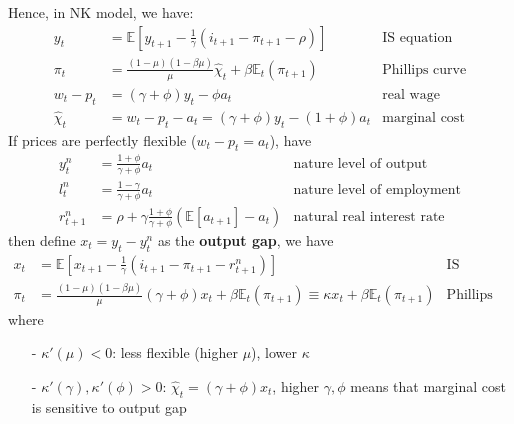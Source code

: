 \documentclass[10pt,landscape,a4paper]{article}
\begin{document}
\begin{multicols*}{3}
Hence, in NK model, we have:
\begin{align*}
    y_t &= \mathbb{E}\left[y_{t+1}-\frac{1}{\gamma} (i_{t+1}-\pi_{t+1}-\rho)\right] & \text{IS equation}\\
    \pi_t &= \frac{(1-\mu)(1-\beta\mu)}{\mu}\hat{\chi}_t+\beta\mathbb{E}_t(\pi_{t+1}) & \text{Phillips curve}\\
    w_t-p_t &= (\gamma+\phi)y_t-\phi a_t &\text{real wage}\\
    \hat{\chi}_t &= w_t-p_t -a_t = (\gamma+\phi)y_t-(1+\phi) a_t &\text{marginal cost}
\end{align*}
If prices are perfectly flexible ($w_t-p_t=a_t$), have
\begin{align*}
    y_t^n &= \frac{1+\phi}{\gamma+\phi}a_t & \text{nature level of output} \\
    l^n_t &= \frac{1-\gamma}{\gamma+\phi}a_t & \text{nature level of employment}\\
    r^n_{t+1} &= \rho + \gamma\frac{1+\phi}{\gamma+\phi}\left(\mathbb{E}[a_{t+1}]-a_t\right) &\text{natural real interest rate}
\end{align*}
then define $x_t = y_{t}-y^n_t$ as the \textbf{\color{myred}output gap}, we have 
\begin{align*}
    x_t &= \mathbb{E}\left[x_{t+1}-\frac{1}{\gamma} (i_{t+1}-\pi_{t+1}-r^n_{t+1})\right] & \text{IS equation}\\
    \pi_t &= \frac{(1-\mu)(1-\beta\mu)}{\mu} (\gamma+\phi)x_t +\beta\mathbb{E}_t(\pi_{t+1})  \equiv \kappa x_t +\beta\mathbb{E}_t (\pi_{t+1}) & \text{Phillips curve}
\end{align*}
where 
\begin{itemize}
    \item[-] $\kappa'(\mu)<0$: less flexible (higher $\mu$), lower $\kappa$
    \item[-] $\kappa'(\gamma),\kappa'(\phi)>0$: $\hat{\chi}_t = (\gamma+\phi)x_t$, higher $\gamma,\phi$ means that marginal cost is sensitive to output gap
\end{itemize}


\end{multicols*}
\end{document}
